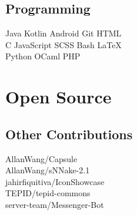 \documentclass[]{allanwang-resume}
\begin{document}
\begin{minipage}[t][][b]{0.33\textwidth}
	\subsection{Programming}
	Java \tb Kotlin \tb Android \tb Git \tb HTML\\
	C \tb JavaScript \tb SCSS \tb Bash \tb \LaTeX\ \\
	Python \tb OCaml \tb PHP \\
	\sectionsep

	\section{Open Source}
	\subsection{Other Contributions}
	AllanWang/Capsule \\
	AllanWang/sNNake-2.1 \\
	jahirfiquitiva/IconShowcase \\
	TEPID/tepid-commons \\
	server-team/Messenger-Bot \\

\end{minipage}
\hfill
\end{document}
